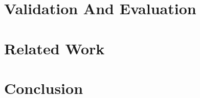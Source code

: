 \documentclass[12pt,twoside]{report}
\theoremstyle{definition}
\begin{document}
\chapter{Validation And Evaluation}


\chapter{Related Work}


\chapter{Conclusion}



\begin{appendices}
\titleformat{\chapter}{\normalfont\huge}{\appendixname{} \thechapter}{20pt}{\bfseries\huge}



\end{appendices}



\pagestyle{PageNum}
\end{document}
